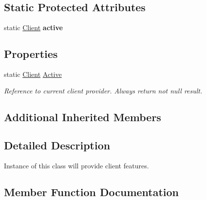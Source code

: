 \subsection*{Static Protected Attributes}
\begin{DoxyCompactItemize}
\item 
\mbox{\label{class_teacher_handbook_1_1_client_aaa6bae79ce27b06ba243b4b87f1822a5}} 
static \mbox{\hyperlink{class_teacher_handbook_1_1_client}{Client}} {\bfseries active}
\end{DoxyCompactItemize}
\subsection*{Properties}
\begin{DoxyCompactItemize}
\item 
static \mbox{\hyperlink{class_teacher_handbook_1_1_client}{Client}} \mbox{\hyperlink{class_teacher_handbook_1_1_client_a403583a80a8d5040410c4f1f180aafad}{Active}}
\begin{DoxyCompactList}\small\item\em Reference to current client provider. Always return not null result. \end{DoxyCompactList}\end{DoxyCompactItemize}
\subsection*{Additional Inherited Members}


\subsection{Detailed Description}
Instance of this class will provide client features. 



\subsection{Member Function Documentation}
\mbox{\label{class_teacher_handbook_1_1_client_a8cf998f202069ab5bbbfcdc779e4af29}} 
